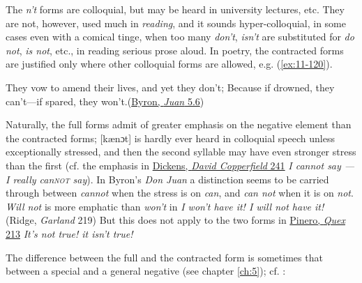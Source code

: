 \bigskip
{}
The \textit{n't} forms are colloquial, but may be heard in university lectures, etc. They are not, however, used much in \textit{reading}, and it sounds hyper-colloquial, in some cases even with a comical tinge, when too many 
\textit{don't},\textit{ isn't} are substituted for 
\textit{do not},\textit{ is not}, etc., in reading serious prose aloud. In poetry, the contracted forms are justified only where other colloquial forms are allowed, e.g. (\ref{ex:11-120}).

\ea \label{ex:11-120}
They vow to amend their lives, and yet they don't; Because if drowned, they can't---if spared, they won't.\hfill(\href{https://archive.org/details/workslordbyron10unkngoog/page/220/mode/2up?view=theater&q=%22amend+their+lives%22}{Byron, \textit{Juan} 5.6})
\z

Naturally, the full forms admit of greater emphasis on the negative element than the contracted forms; [kænɔt] is hardly ever heard in colloquial speech unless exceptionally stressed, and then the second syllable may have even stronger stress than the first (cf. the emphasis %
in \href{https://archive.org/details/personalhistory05dickgoog/page/n109/mode/2up?q=%22I+cannot+say%22&view=theater}{Dickens, \textit{David Copperfield} 241} \textit{I cannot say --- I really can\textsc{not} say}). In Byron's \textit{Don Juan} a distinction seems to be carried through between \textit{cannot} when the stress is on \textit{can}, and \textit{can not} when it is on \textit{not}. 
\textit{Will not} is more emphatic than \textit{won't} in \textit{I won't have it! I will not have it!} (Ridge, \textit{Garland} 219) %
But this does not apply to the two forms in \href{https://archive.org/details/gaylordquexcomed00pine/page/174/mode/2up?q=%22it%27s+not+true%22&view=theater}{Pinero, \textit{Quex} 213} \textit{It's not true! it isn't true!} 

The difference between the full and the contracted form is sometimes that between a special and a general negative (see chapter \ref{ch:5}); cf. \citet[§366]{sweet1892new1}:%


